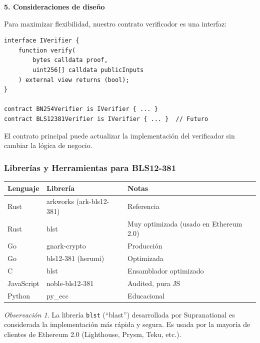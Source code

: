 \documentclass[11pt,a4paper,twoside,openright]{book}
\theoremstyle{definition}
\theoremstyle{plain}
\theoremstyle{remark}
\newtheorem{remark}{Observación}[chapter]
\begin{document}
\begin{bancozk}
\textbf{5. Consideraciones de diseño}

Para maximizar flexibilidad, nuestro contrato verificador es una interfaz:
\begin{verbatim}
interface IVerifier {
    function verify(
        bytes calldata proof,
        uint256[] calldata publicInputs
    ) external view returns (bool);
}

contract BN254Verifier is IVerifier { ... }
contract BLS12381Verifier is IVerifier { ... }  // Futuro
\end{verbatim}

El contrato principal puede actualizar la implementación del verificador sin cambiar la lógica de negocio.
\end{bancozk}

\subsubsection{Librerías y Herramientas para BLS12-381}

\begin{center}
\begin{tabular}{lll}
\toprule
\textbf{Lenguaje} & \textbf{Librería} & \textbf{Notas} \\
\midrule
Rust & arkworks (ark-bls12-381) & Referencia \\
Rust & blst & Muy optimizada (usado en Ethereum 2.0) \\
Go & gnark-crypto & Producción \\
Go & bls12-381 (herumi) & Optimizada \\
C & blst & Ensamblador optimizado \\
JavaScript & noble-bls12-381 & Audited, pura JS \\
Python & py\_ecc & Educacional \\
\bottomrule
\end{tabular}
\end{center}

\begin{remark}
La librería \texttt{blst} (``blast'') desarrollada por Supranational es considerada la implementación más rápida y segura. Es usada por la mayoría de clientes de Ethereum 2.0 (Lighthouse, Prysm, Teku, etc.).
\end{remark}

\end{document}

